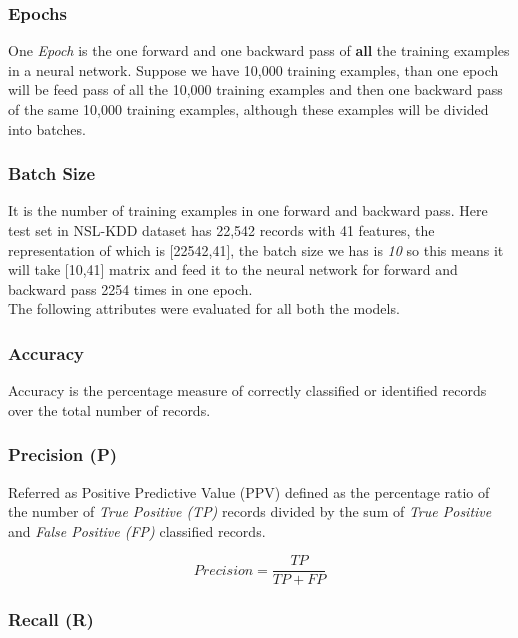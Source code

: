 \documentclass[12pt, a4paper]{report}
\begin{document}
\subsubsection{Epochs}
One \textit{Epoch} is the one forward and one backward pass of \textbf{all} the training examples in a neural network. Suppose we have 10,000 training examples, than one epoch will be feed pass of all the 10,000 training examples and then one backward pass of the same 10,000 training examples, although these examples will be divided into batches.\\

\subsubsection{Batch Size}
It is the number of training examples in one forward and backward pass. Here test set in NSL-KDD dataset has 22,542 records with 41 features, the representation of which is [22542,41], the batch size we has is \textit{10} so this means it will take [10,41] matrix and feed it to the neural network for forward and backward pass 2254 times in one epoch.\\

The following attributes were evaluated for all both the models.\\

\subsubsection{Accuracy}
Accuracy is the percentage measure of correctly classified or identified records over the total number of records.\\

\subsubsection{Precision (P)}
Referred as Positive Predictive Value (PPV)  defined as the percentage ratio of the number of \textit{True Positive (TP)} records divided by the sum of \textit{True Positive} and \textit{False Positive (FP)} classified records.\\ \par
\begin{equation}
Precision = \frac{TP}{TP+FP}
\end{equation}

\subsubsection{Recall (R)}
\end{document}
